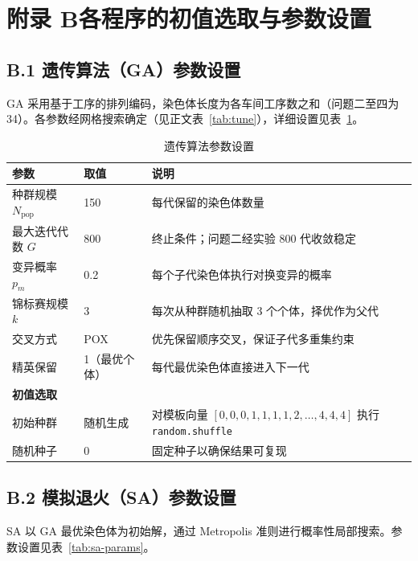 \documentclass[12pt,a4paper]{ctexart}
\begin{document}
\section{附录 B\quad 各程序的初值选取与参数设置}

\subsection*{B.1 遗传算法（GA）参数设置}

GA 采用基于工序的排列编码，染色体长度为各车间工序数之和（问题二至四为 34）。各参数经网格搜索确定（见正文表~\ref{tab:tune}），详细设置见表~\ref{tab:ga-params}。

\begin{table}[H]
\centering
\caption{遗传算法参数设置}\label{tab:ga-params}
\begin{tabular}{p{4.5cm} p{3.5cm} p{6.5cm}}
\toprule
\textbf{参数} & \textbf{取值} & \textbf{说明} \\
\midrule
种群规模 $N_{\mathrm{pop}}$ & 150 & 每代保留的染色体数量 \\
最大迭代代数 $G$ & 800 & 终止条件；问题二经实验 800 代收敛稳定 \\
变异概率 $p_m$ & 0.2 & 每个子代染色体执行对换变异的概率 \\
锦标赛规模 $k$ & 3 & 每次从种群随机抽取 3 个个体，择优作为父代 \\
交叉方式 & POX & 优先保留顺序交叉，保证子代多重集约束 \\
精英保留 & 1（最优个体） & 每代最优染色体直接进入下一代 \\
\midrule
\multicolumn{3}{l}{\textbf{初值选取}} \\
\midrule
初始种群 & 随机生成 & 对模板向量 $[0,0,0,1,1,1,1,2,\dots,4,4,4]$ 执行 \texttt{random.shuffle} \\
随机种子 & 0 & 固定种子以确保结果可复现 \\
\bottomrule
\end{tabular}
\end{table}

\subsection*{B.2 模拟退火（SA）参数设置}

SA 以 GA 最优染色体为初始解，通过 Metropolis 准则进行概率性局部搜索。参数设置见表~\ref{tab:sa-params}。
\end{document}
